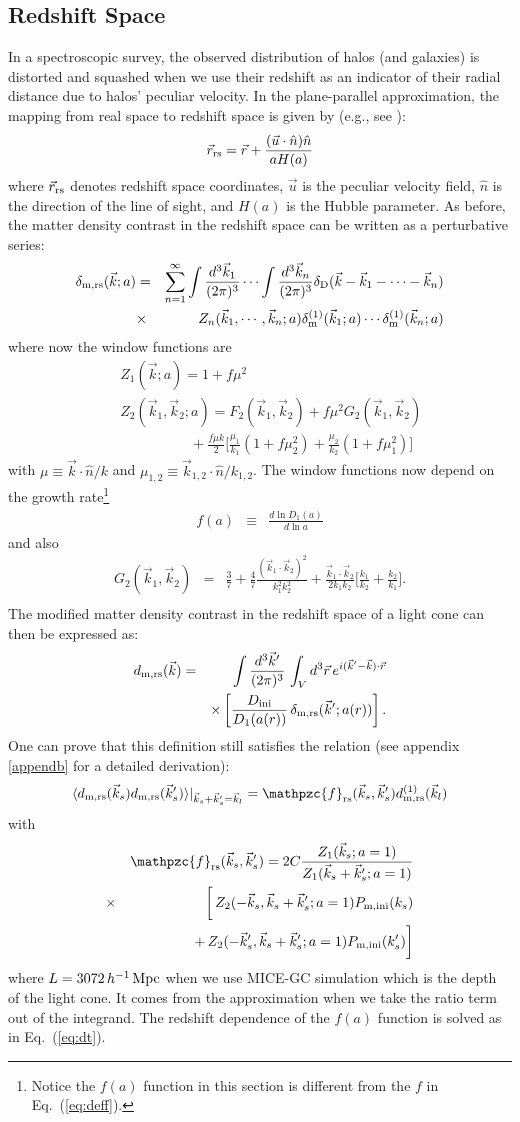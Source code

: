 \documentclass[prd,amsmath,amssymb,floatfix,superscriptaddress,nofootinbib,twocolumn]{revtex4-1}
\def\be{\begin{equation}}
\def\ee{\end{equation}}
\def\bea{\begin{eqnarray}}
\def\eea{\end{eqnarray}}
\newcommand{\m}{\rm m}
\newcommand{\rs}{\rm rs}
\newcommand{\ini}{\rm ini}
\newcommand{\vrr}{\vec{r}}
\newcommand{\vs}{\nonumber\\}
\newcommand{\vk}{\vec{k}}
\newcommand{\ec}[1]{Eq.~(\ref{eq:#1})}
\newcommand{\eql}[1]{\label{eq:#1}}
\begin{document}
\subsection{Redshift Space} \label{sec7}
In a spectroscopic survey, the observed distribution of halos (and galaxies) is distorted and squashed when we use their redshift as an indicator of their radial distance due to halos' peculiar velocity. In the plane-parallel approximation, the mapping from real space to redshift space is given by (e.g., see \cite{Bernardeau:2002rev}):
\be 
\vrr_{\rs} = \vrr + \frac{(\vec{u}\cdot \hat{n})\hat{n}}{aH(a)}
\ee 
where $\vrr_{\rs}$ denotes redshift space coordinates, $\vec{u}$ is the peculiar velocity field, $\hat{n}$ is the direction of the line of sight, and $H(a)$ is the Hubble parameter. As before, the matter density contrast in the redshift space can be written as a perturbative series:
\bea 
\delta_{\m,\rs}(\vk;a)&=&\sum_{n=1}^{\infty} \int\frac{d^3 \vk_1}{(2\pi)^3} \cdots \int \frac{d^3 \vk_n}{(2\pi)^3} \delta_{\rm D}(\vk-\vk_1 - \cdots -\vk_n) \nonumber \\
&\times & Z_n (\vk_1,\cdots,\vk_n;a)\delta_{\m}^{(1)}(\vk_1;a)\cdots \delta_{\m}^{(1)}(\vk_n;a) \eql{rspt} \vs
\eea
where now the window functions are
\bea 
&&Z_1(\vk;a)=1+f\mu^2 \\ 
&&Z_2(\vk_1,\vk_2;a)=F_{2}(\vk_1,\vk_2)+f\mu^2 G_2(\vk_1,\vk_2)\vs 
&&\qquad \qquad\quad+\frac{f\mu k}{2}\bigg[ \frac{\mu_1}{k_1}(1+f\mu_2^2)+\frac{\mu_2}{k_2}(1+f\mu_1^2)\bigg]
\eea 
with $\mu \equiv \vk \cdot \hat{n}/k$ and $\mu_{1,2} \equiv \vk_{1,2} \cdot \hat{n}/k_{1,2}$.  The window functions now depend on the growth rate\footnote{Notice the $f(a)$ function in this section is different from the $f$ in \ec{deff}.}
\bea 
f(a)&\equiv & \frac{d \ln D_{1}(a)}{d \ln a}\eea
and also
\bea
G_2(\vk_1,\vk_2)&=&\frac{3}{7}+\frac{4}{7}\frac{(\vk_1\cdot \vk_2)^2}{k_1^2 k_2^2}+\frac{\vk_1\cdot \vk_2}{2k_1k_2}\bigg[\frac{k_1}{k_2}+\frac{k_2}{k_1}\bigg].\vs
\eea 
The modified matter density contrast in the redshift space of a light cone can then be expressed as: 
\bea
d_{\rm m,\rs}(\vk) &=&\int \frac{d^3 \vk'}{(2\pi)^3}\, \int_{V} d^3\vrr \,  e^{i(\vk'-\vk) \cdot\vrr} \vs
&&\times  \left[ \frac{D_{\ini}}{D_{1}(a(r))}  
\, \delta_{\rm m,\rs}(\vk';a(r))\right].
\eea
One can prove that this definition still satisfies the relation (see appendix \ref{appendb} for a detailed derivation):
\be 
\langle d_{\rm m,\rs }(\vk_s)d_{\rm m,\rs }(\vk_s') \rangle|_{\vk_s+\vk_s'=\vk_l} =\mathpzc{f}_{\rs}(\vec{k}_s,\vec{k}_s'){d}^{(1)}_{\rm m,\rs}(\vec{k}_l) \eql{2ptddrs}
\ee 
with 
\bea
&&\mathpzc{f}_{\rs}(\vec{k}_s,\vec{k}_s')=2C\frac{Z_{1}(\vk_s;a=1)}{Z_{1}(\vk_s+\vk_s';a=1)}\vs
&\times&\bigg[\,Z_2(-\vec{k}_s,\vec{k}_s+\vec{k}_s';a=1)P_{\rm m,ini}(k_s)\vs
&&+\,Z_2(-\vec{k}_s',\vec{k}_s+\vec{k}_s';a=1)P_{\rm m,ini}(k_s')\bigg]  \vs   
\eea 
where $L=3072\, h^{-1}\, \rm Mpc$ when we use MICE-GC simulation which is the depth of the light cone. It comes from the approximation when we take the ratio term out of the integrand. The redshift dependence of the $f(a)$ function is solved as in \ec{dt}. 
\end{document}

